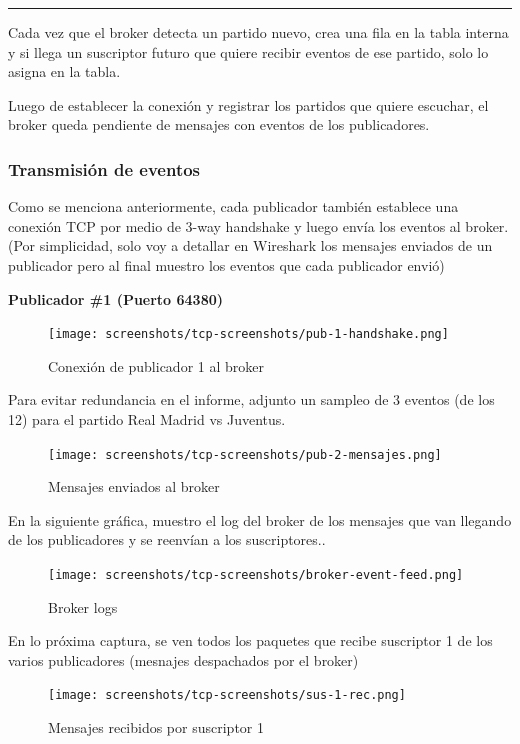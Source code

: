 \documentclass[10pt]{article}
\begin{document}
\vspace{1mm} %
\noindent\rule{\linewidth}{0.4pt} %
\vspace{1mm} %


Cada vez que el broker detecta un partido nuevo, crea una fila en la tabla interna y si llega un suscriptor futuro que quiere recibir eventos de ese partido, solo lo asigna en la tabla.

Luego de establecer la conexión y registrar los partidos que quiere escuchar, el broker queda pendiente de mensajes con eventos de los publicadores. 

\subsubsection{Transmisión de eventos}

Como se menciona anteriormente, cada publicador también establece una conexión TCP por medio de 3-way handshake y luego envía los eventos al broker. (Por simplicidad, solo voy a detallar en Wireshark los mensajes enviados de un publicador pero al final muestro los eventos que cada publicador envió)

\textbf{Publicador \#1 (Puerto 64380)}

\begin{figure}[H]
    \centering
    \texttt{[image: screenshots/tcp-screenshots/pub-1-handshake.png]}
    \caption{Conexión de publicador 1 al broker}
\end{figure} 

Para evitar redundancia en el informe, adjunto un sampleo de 3 eventos (de los 12) para el partido Real Madrid vs Juventus. 

\begin{figure}[H]
    \centering
    \texttt{[image: screenshots/tcp-screenshots/pub-2-mensajes.png]}
    \caption{Mensajes enviados al broker}
\end{figure} 

En la siguiente gráfica, muestro el log del broker de los mensajes que van llegando de los publicadores y se reenvían a los suscriptores..

\begin{figure}[H]
    \centering
    \texttt{[image: screenshots/tcp-screenshots/broker-event-feed.png]}
    \caption{Broker logs}
\end{figure} 

En lo próxima captura, se ven todos los paquetes que recibe suscriptor 1 de los varios publicadores (mesnajes despachados por el broker)
\begin{figure}[H]
    \centering
    \texttt{[image: screenshots/tcp-screenshots/sus-1-rec.png]}
    \caption{Mensajes recibidos por suscriptor 1}
\end{figure} 
\end{document}
